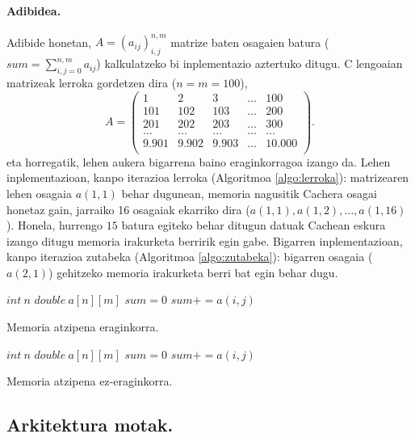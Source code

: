 \paragraph*{Adibidea.} Adibide honetan, $A=(a_{ij})_{i,j}^{n,m}$ matrize baten osagaien batura ($sum=\sum_{i,j=0}^{n,m} a_{ij}$) kalkulatzeko bi inplementazio aztertuko ditugu. C lengoaian matrizeak lerroka gordetzen dira ($n=m=100$),
\begin{equation*}
A=\left(\begin{array}{ccccc}
  1    & 2    & 3    & \dots & 100 \\
  101 & 102 & 103 &\dots & 200 \\
  201 & 202 & 203 &\dots & 300 \\
  \dots & \dots & \dots & \dots & \dots \\
  9.901 & 9.902 & 9.903 &\dots & 10.000 \\
  \end{array}\right).  
\end{equation*}
eta horregatik, lehen aukera bigarrena baino eraginkorragoa izango da. Lehen inplementazioan, kanpo iterazioa lerroka (Algoritmoa \ref{algo:lerroka}):  matrizearen lehen osagaia $a(1,1)$ behar dugunean, memoria nagusitik Cachera osagai honetaz gain, jarraiko 16 osagaiak ekarriko dira ($a(1,1),a(1,2),\dots,a(1,16)$). Honela, hurrengo $15$ batura egiteko behar ditugun datuak Cachean eskura izango ditugu memoria irakurketa berririk egin gabe. Bigarren inplementazioan, kanpo iterazioa zutabeka (Algoritmoa \ref{algo:zutabeka}): bigarren osagaia ($a(2,1)$) gehitzeko memoria irakurketa berri bat egin behar dugu. 

\begin{algorithm}[h]
 \BlankLine
  $int \ n$\;
  $double \ a[n][m]$\;
  \BlankLine
  $sum=0$\;
  {
   \BlankLine
   {
    \BlankLine 
    $sum+=a(i,j)$\;
   }
 }
 \caption{Memoria atzipena eraginkorra.}
 \label{algo:lerroka}
\end{algorithm} 
\begin{algorithm}[h]
 \BlankLine
  $int \ n$\;
  $double \ a[n][m]$\;
  \BlankLine
  $sum=0$\;
  {
   \BlankLine
   {
    \BlankLine 
    $sum+=a(i,j)$\;
   }
 }
 \caption{Memoria atzipena ez-eraginkorra.}
 \label{algo:zutabeka}
\end{algorithm} 




\subsection*{Arkitektura motak.}

